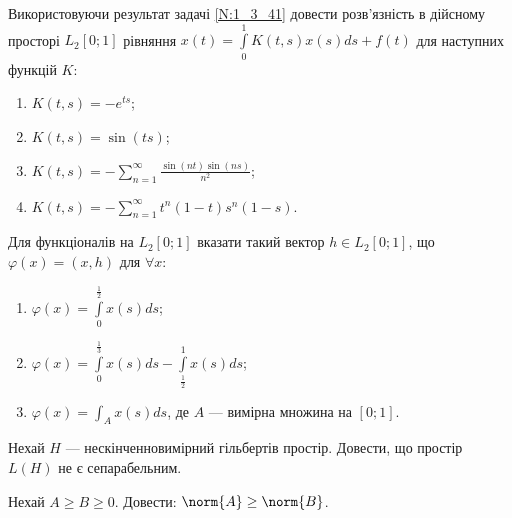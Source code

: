 \begin{exercise}
    Використовуючи результат задачі \ref{N:1_3_41} довести розв'язність в дійсному просторі $L_2[0; 1]$ рівняння
    $x(t) = \int\limits_{0}^1 K(t, s)x(s)ds + f(t)$ для наступних функцій $K$:
    \begin{enumerate}[label=\ukr*)]
        \item $K(t, s) = -e^{ts}$;
        \item $K(t, s) = \sin(ts)$;
        \item $K(t, s) = -\sum\limits_{n = 1}^\infty \frac{\sin(nt)\sin(ns)}{n^2}$;
        \item $K(t, s) = -\sum\limits_{n = 1}^\infty t^n(1-t)s^n(1-s)$.
    \end{enumerate}
\end{exercise}

\begin{exercise}
    Для функціоналів на $L_2[0; 1]$ вказати такий вектор $h \in L_2[0; 1]$, що $\varphi(x) = (x, h)$ для $\forall x$:
    \begin{enumerate}[label=\ukr*)]
        \item $\varphi(x) = \int\limits_{0}^{\frac{1}{2}}x(s)ds$;
        \item $\varphi(x) = \int\limits_{0}^{\frac{1}{3}}x(s)ds - \int\limits_{\frac{1}{2}}^{1}x(s)ds$;
        \item $\varphi(x) = \int_Ax(s)ds$, де $A$ --- вимірна множина на $[0; 1]$.
    \end{enumerate}
\end{exercise}

\begin{exercise}
    Нехай $H$ --- нескінченновимірний гільбертів простір. Довести, що простір $L(H)$ не є сепарабельним.
\end{exercise}

\begin{exercise}
    Нехай $A \geq B \geq 0$. Довести: $\norm{A} \geq \norm{B}$.
\end{exercise}